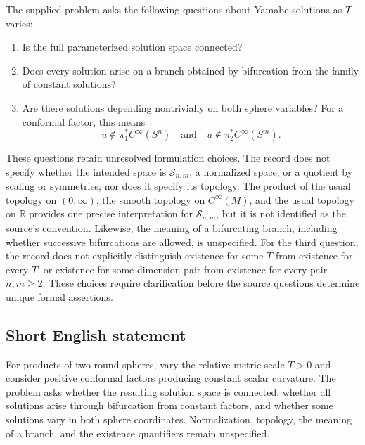 \documentclass[11pt]{article}
\newcommand{\R}{\mathbb{R}}
\begin{document}
The supplied problem asks the following questions about Yamabe solutions as \(T\) varies:
\begin{enumerate}
\item Is the full parameterized solution space connected?
\item Does every solution arise on a branch obtained by bifurcation from the family of constant solutions?
\item Are there solutions depending nontrivially on both sphere variables? For a conformal factor, this means
\[
 u\notin\pi_1^*C^\infty(S^n)
 \quad\text{and}\quad
 u\notin\pi_2^*C^\infty(S^m).
\]
\end{enumerate}
These questions retain unresolved formulation choices. The record does not specify whether the intended space is \(\mathcal S_{n,m}\), a normalized space, or a quotient by scaling or symmetries; nor does it specify its topology. The product of the usual topology on \((0,\infty)\), the smooth topology on \(C^\infty(M)\), and the usual topology on \(\R\) provides one precise interpretation for \(\mathcal S_{n,m}\), but it is not identified as the source's convention. Likewise, the meaning of a bifurcating branch, including whether successive bifurcations are allowed, is unspecified. For the third question, the record does not explicitly distinguish existence for some \(T\) from existence for every \(T\), or existence for some dimension pair from existence for every pair \(n,m\geq2\). These choices require clarification before the source questions determine unique formal assertions.
\subsection{Short English statement}
For products of two round spheres, vary the relative metric scale \(T>0\) and consider positive conformal factors producing constant scalar curvature. The problem asks whether the resulting solution space is connected, whether all solutions arise through bifurcation from constant factors, and whether some solutions vary in both sphere coordinates. Normalization, topology, the meaning of a branch, and the existence quantifiers remain unspecified.
\end{document}
